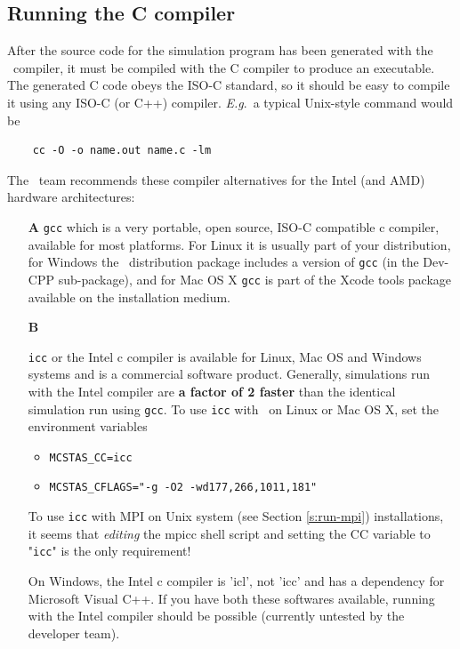 \subsection{Running the C compiler}
\label{s:compile}

After the source code for the simulation program has been generated with
the \MCX\ compiler, it must be compiled with the C compiler to produce
an executable. The generated C code obeys the ISO-C standard, so it
should be easy to compile it using any ISO-C (or C++) compiler. \textit{E.g}.\ a
typical Unix-style command would be
\begin{verbatim}
    cc -O -o name.out name.c -lm
\end{verbatim}
The \MCX\ team recommends these compiler alternatives for the Intel
(and AMD) hardware architectures:
\begin{itemize}
\item[\bfseries A]{\verb+gcc+ which is a very portable, open source, ISO-C
    compatible c compiler, available for most platforms. For Linux it
    is usually part of your distribution, for Windows the \MCX\
    distribution package includes a version of \verb+gcc+
    (in the Dev-CPP sub-package), and for Mac OS X \verb+gcc+ is part
    of the Xcode tools package available on the installation medium.}
\item[\bfseries B]{\verb+icc+ or the Intel c compiler is available for Linux, Mac
    OS and Windows systems and is a commercial software
    product. Generally, simulations run with the Intel compiler are
    {\bfseries a factor of 2 faster} than the identical simulation run using \verb+gcc+. To use \verb+icc+ with \MCX\ on Linux or Mac OS X, set the environment variables
    \begin{itemize}
      \item{\verb+MCSTAS_CC=icc+}
      \item{\verb+MCSTAS_CFLAGS="-g -O2 -wd177,266,1011,181"+}
    \end{itemize}
    To use \verb+icc+ with MPI on Unix system (see Section \ref{s:run-mpi})
 installations, it seems that \emph{editing}
    the mpicc shell script and setting the CC variable to "\verb+icc+" is the
    only requirement!}
    On Windows, the Intel c compiler is 'icl', not 'icc' and has a dependency for Microsoft Visual C++. If you have both these softwares available, running \MCX  with the Intel compiler should be possible (currently untested by the \MCX  developer team).

\end{itemize}


